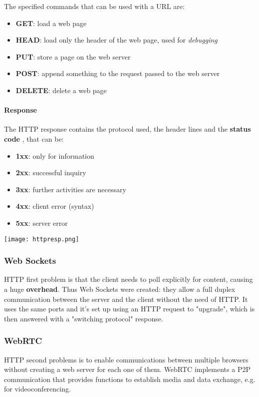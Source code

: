 \noindent The specified commands that can be used with a URL are:
\begin{itemize}
	\item \textbf{GET}: load a web page
	\item \textbf{HEAD}: load only the header of the web page, used for \textit{debugging}
	\item \textbf{PUT}: store a page on the web server
	\item \textbf{POST}: append something to the request passed to the web server
	\item \textbf{DELETE}: delete a web page
\end{itemize}

\newpage
\paragraph{Response}  The HTTP response contains the protocol used, the header lines and the \textbf{status code} , that can be:
\begin{itemize}
	\item \textbf{1xx}: only for information
	\item \textbf{2xx}: successful inquiry
	\item \textbf{3xx}: further activities are necessary
	\item \textbf{4xx}: client error (syntax)
	\item \textbf{5xx}: server error
\end{itemize}
\begin{center}
	\texttt{[image: httpresp.png]}
\end{center}

\subsubsection{Web Sockets}
HTTP first problem is that the client needs to poll explicitly for content, causing a huge \textbf{overhead}. Thus Web Sockets were created: they allow a full duplex communication between the server and the client without the need of HTTP. It uses the same ports and it's set up using an HTTP request to "upgrade", which is then answered with a "switching protocol" response.

\subsubsection{WebRTC}
HTTP second problems is to enable communications between multiple browsers without creating a web server for each one of them. WebRTC implements a P2P communication that provides functions to establish media and data exchange, e.g. for videoconferencing.

